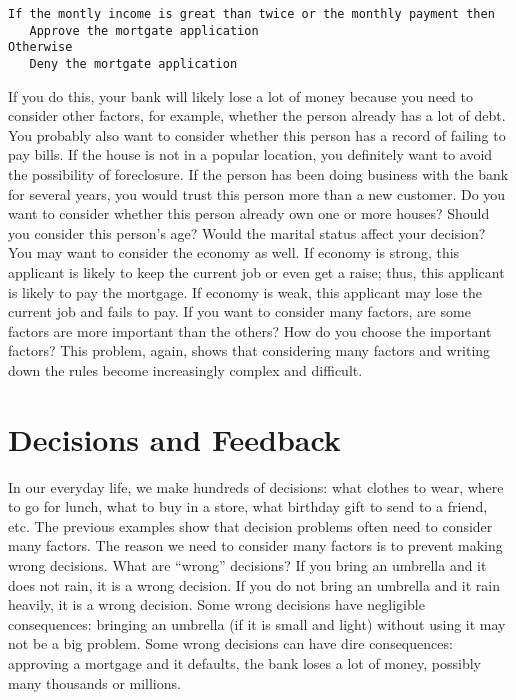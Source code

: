 \begin{verbatim}
If the montly income is great than twice or the monthly payment then
   Approve the mortgate application
Otherwise
   Deny the mortgate application
\end{verbatim}

If you do this, your bank will likely lose a lot of money because you
need to consider other factors, for example, whether the person
already has a lot of debt. You probably also want to consider whether
this person has a record of failing to pay bills.  If the house is not
in a popular location, you definitely want to avoid the possibility of
foreclosure. If the person has been doing business with the bank for
several years, you would trust this person more than a new customer.
Do you want to consider whether this person already own one or more
houses?  Should you consider this person's age?  Would the marital
status affect your decision?  You may want to consider the economy as
well. If economy is strong, this applicant is likely to keep the
current job or even get a raise; thus, this applicant is likely to pay
the mortgage. If economy is weak, this applicant may lose the current
job and fails to pay.  If you want to consider many factors, are some
factors are more important than the others? How do you choose the
important factors?  This problem, again, shows that considering many
factors and writing down the rules become increasingly complex and
difficult.

\section{Decisions and Feedback}

In our everyday life, we make hundreds of decisions: what clothes to
wear, where to go for lunch, what to buy in a store, what birthday
gift to send to a friend, etc.  The previous examples show that
decision problems often need to consider many factors.  The reason we
need to consider many factors is to prevent making wrong decisions.
What are ``wrong'' decisions? If you bring an umbrella and it does not
rain, it is a wrong decision.  If you do not bring an umbrella and it
rain heavily, it is a wrong decision.  Some wrong decisions have
negligible consequences: bringing an umbrella (if it is small and
light) without using it may not be a big problem.  Some wrong
decisions can have dire consequences: approving a mortgage and it
defaults, the bank loses a lot of money, possibly many thousands or
millions.

